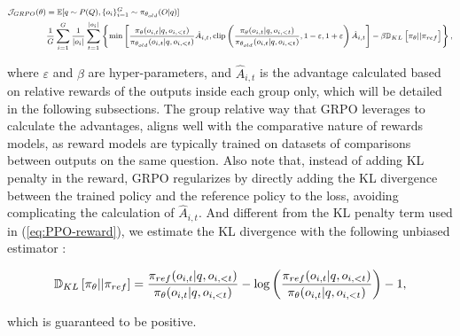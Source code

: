 \begin{itemize}[topsep=0pt]
\begin{itemize}[topsep=0pt]
\begin{equation}
\footnotesize
\begin{split}
    \mathcal{J}_{GRPO}(\theta) &= \mathbb{E}{[q \sim P(Q), \{o_i\}_{i=1}^G \sim \pi_{\theta_{old}}(O|q)]}  \\
    & \frac{1}{G}\sum_{i=1}^G\frac{1}{|o_i|} \sum_{t=1}^{|o_i|} \left\{ \min \left[ \frac{\pi_\theta(o_{i,t} | q, o_{i,<t})}{\pi_{\theta_{old}}(o_{i,t} | q, o_{i,<t})} \hat{A}_{i,t}, \text{clip} \left( \frac{\pi_\theta(o_{i,t} | q, o_{i,<t})}{\pi_{\theta_{old}}(o_{i,t} | q, o_{i,<t})}, 1 - \varepsilon, 1 + \varepsilon \right)  \hat{A}_{i,t} \right] - \beta \mathbb{D}_{KL}\left[\pi_{\theta} || \pi_{ref}\right]\right\} ,
\end{split}
\label{eq:GRPO-obj}
\end{equation}

where $\varepsilon$ and $\beta$ are hyper-parameters, and $\hat{A}_{i,t}$  is the advantage calculated based on relative rewards of the outputs inside each group only, which will be detailed in the following subsections. The group relative way that GRPO leverages to calculate the advantages, aligns well with the comparative nature of rewards models,  as reward models are typically trained on datasets of comparisons between outputs on the same question. Also note that, instead of adding KL penalty in the reward, GRPO regularizes by directly adding the KL divergence between the trained policy and the reference policy to the loss, avoiding complicating the calculation of  $\hat{A}_{i,t}$. And different from the KL penalty term used in (\ref{eq:PPO-reward}), we estimate the KL divergence with the following unbiased estimator \citep{kl_approx}:

\begin{equation}
\small
    \mathbb{D}_{KL}\left[\pi_{\theta} || \pi_{ref}\right] = \frac{\pi_{ref}(o_{i,t}|q,o_{i,<t})}{\pi_{\theta}(o_{i,t}|q,o_{i,<t})} - \log\left(\frac{\pi_{ref}(o_{i,t}|q,o_{i,<t})}{\pi_{\theta}(o_{i,t}|q,o_{i,<t})}\right) - 1,
\end{equation}

which is guaranteed to be positive.


\end{itemize}
\end{itemize}
